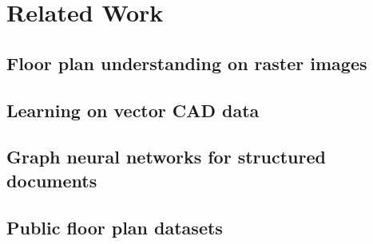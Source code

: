 \chapter{Related Work}
\label{ch:related_work}


\section{Floor plan understanding on raster images}

\section{Learning on vector CAD data}

\section{Graph neural networks for structured documents}

\section{Public floor plan datasets}
